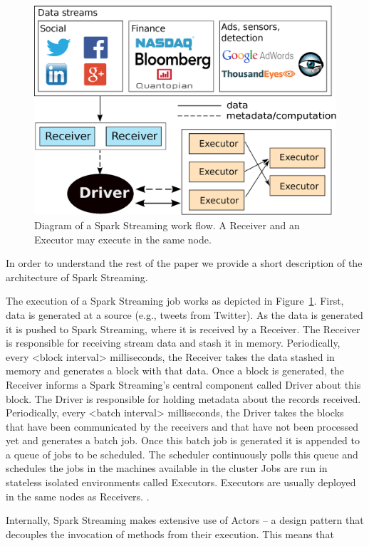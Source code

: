 
\begin{figure}[t!]
  \begin{center}
    \includegraphics[scale=0.30]{images_graphs/spark_architecture_v4.eps}
  \end{center}
  \caption{Diagram of a Spark Streaming work flow. A Receiver and an Executor may execute in the same node.}
  \label{fig:SparkStreaming_architecture}
\end{figure}

In order to understand the rest of the paper we provide a short description of the architecture of Spark Streaming.

The execution of a Spark Streaming job works as depicted in Figure~\ref{fig:SparkStreaming_architecture}. 
First, data is generated at a source (e.g., tweets from Twitter). As the data is generated it is pushed to Spark Streaming, where it is received by a Receiver. 
The Receiver is responsible for receiving stream data and stash it in memory. Periodically, every <block interval> milliseconds, the Receiver takes the data stashed in memory and generates a block with that data. 
Once a block is generated, the Receiver informs a Spark Streaming's central component called Driver about this block. The Driver is responsible for holding metadata about the records received. 
Periodically, every <batch interval> milliseconds, the Driver takes the blocks that have been communicated by the receivers and that have not been processed yet and generates a batch job. 
Once this batch job is generated it is appended to a queue of jobs to be scheduled. 
The scheduler continuously polls this queue and schedules the jobs in the machines available in the cluster
Jobs are run in stateless isolated environments called Executors. Executors are usually deployed in the same nodes as Receivers.  .

Internally, Spark Streaming makes extensive use of Actors -- a design pattern that decouples the invocation of methods from their execution. This means that 
